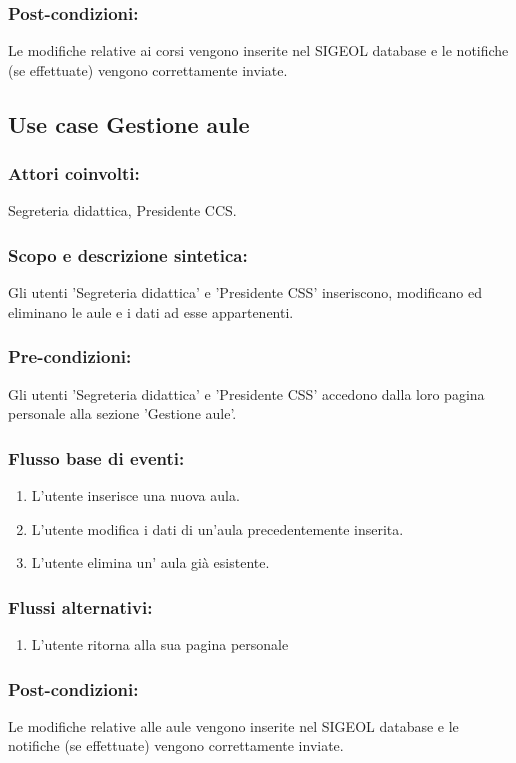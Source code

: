 \documentclass[11pt,a4paper]{article}
\begin{document}
\subsubsection*{Post-condizioni:}
Le modifiche relative ai corsi vengono inserite nel SIGEOL database e le notifiche (se effettuate) vengono correttamente 
inviate.
\subsection{Use case Gestione aule}
\subsubsection*{Attori coinvolti:}
Segreteria didattica, Presidente CCS.
\subsubsection*{Scopo e descrizione sintetica:}
Gli utenti 'Segreteria didattica' e 'Presidente CSS' inseriscono, modificano ed eliminano le aule e i dati ad esse appartenenti.
\subsubsection*{Pre-condizioni:}
Gli utenti 'Segreteria didattica' e 'Presidente CSS' accedono dalla loro pagina personale alla sezione 'Gestione aule'.
\subsubsection*{Flusso base di eventi:}
\begin{enumerate}
 \item L'utente inserisce una nuova aula. 
 \item L'utente modifica i dati di un'aula precedentemente inserita.
 \item L'utente elimina un' aula già esistente.
\end{enumerate}
\subsubsection*{Flussi alternativi:}
\begin{enumerate} 
\item L'utente ritorna alla sua pagina personale
\end{enumerate}
\subsubsection*{Post-condizioni:}
Le modifiche relative alle aule vengono inserite nel SIGEOL database e le notifiche (se effettuate) vengono correttamente 
inviate.
\end{document}
